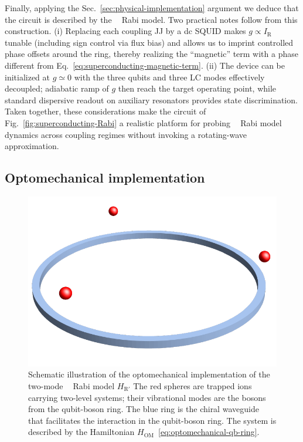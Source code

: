 \documentclass[reprint, aps, prx, amsmath, amssymb, longbibliography, superscriptaddress]{revtex4-2}
\DeclareMathOperator{\Zthree}{\mathbb{Z}_3}
\begin{document}
Finally, applying the Sec.~\ref{sec:physical-implementation} argument we deduce that the circuit is described by the $\Zthree$ Rabi model. Two practical notes follow from this construction. (i) Replacing each coupling JJ by a dc SQUID makes $g \propto I_{\mathrm{R}}$ tunable (including sign control via flux bias) and allows us to imprint controlled phase offsets around the ring, thereby realizing the ``magnetic'' term with a phase different from Eq.~\eqref{eq:superconducting-magnetic-term}. (ii) The device can be initialized at $g\simeq 0$ with the three qubits and three LC modes effectively decoupled; adiabatic ramp of $g$ then reach the target operating point, while standard dispersive readout on auxiliary resonators provides state discrimination. Taken together, these considerations make the circuit of Fig.~\ref{fig:superconducting-Rabi} a realistic platform for probing $\Zthree$ Rabi model dynamics across coupling regimes without invoking a rotating-wave approximation.


\subsection{Optomechanical implementation}
\label{sec:optomechanical-implementation}

\begin{figure}
    \includegraphics[width=0.8\linewidth]{pics/optomechanical_Rabi_pic.pdf}
    \caption{Schematic illustration of the optomechanical implementation of the two-mode $\Zthree$ Rabi model $ H_{\text{R}'}$ \cite{sedov_chiral_2020} The red spheres are trapped ions carrying two-level systems; their vibrational modes are the bosons from the qubit-boson ring. The blue ring is the chiral waveguide that facilitates the interaction in the qubit-boson ring. The system is described by the Hamiltonian $ H_{\text{OM}}$~\eqref{eq:optomechanical-qb-ring}.}
    \label{fig:optomechanical-rabi}
\end{figure}
\end{document}
